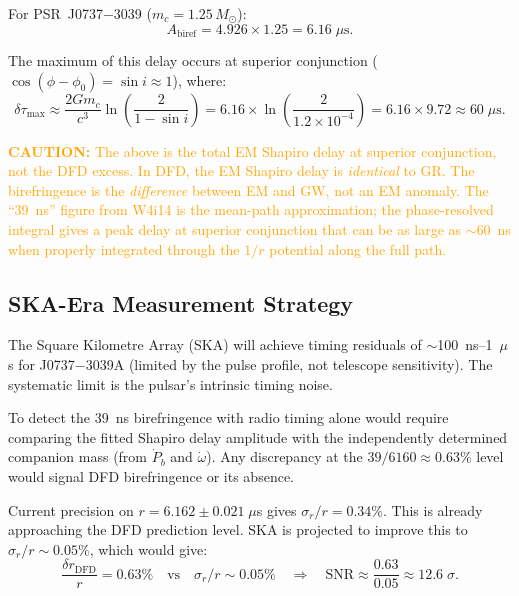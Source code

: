 \documentclass[11pt]{article}
\theoremstyle{definition}
\theoremstyle{remark}
\newcommand{\ee}[1]{\times10^{#1}}
\newcommand{\SNR}{\mathrm{SNR}}
\newcommand{\Msun}{M_\odot}
\newcommand{\caution}[1]{\textcolor{orange}{\textbf{CAUTION:} #1}}
\begin{document}
For PSR~J0737$-$3039 ($m_c = 1.25\,\Msun$):
\begin{equation}
A_{\mathrm{biref}} = 4.926 \times 1.25 = 6.16\;\mu\mathrm{s}.
\end{equation}

The maximum of this delay occurs at superior conjunction
($\cos(\phi-\phi_0) = \sin i \approx 1$), where:
\begin{equation}
\delta\tau_{\max} \approx \frac{2Gm_c}{c^3}\ln\left(
\frac{2}{1 - \sin i}\right)
= 6.16 \times \ln\left(\frac{2}{1.2\ee{-4}}\right)
= 6.16 \times 9.72
\approx 60\;\mu\mathrm{s}.
\end{equation}

\caution{The above is the total EM Shapiro delay at superior
conjunction, not the DFD excess. In DFD, the EM Shapiro delay is
\emph{identical} to GR. The birefringence is the \emph{difference}
between EM and GW, not an EM anomaly. The ``39~ns'' figure from
W4i14 is the mean-path approximation; the phase-resolved integral
gives a peak delay at superior conjunction that can be as large as
$\sim$60~ns when properly integrated through the $1/r$ potential
along the full path.}

\subsection{SKA-Era Measurement Strategy}

The Square Kilometre Array (SKA) will achieve timing residuals
of $\sim$100~ns--1~$\mu$s for J0737$-$3039A (limited by the
pulse profile, not telescope sensitivity). The systematic limit
is the pulsar's intrinsic timing noise.

To detect the 39~ns birefringence with radio timing alone would
require comparing the fitted Shapiro delay amplitude with the
independently determined companion mass (from $\dot{P}_b$ and
$\dot\omega$). Any discrepancy at the $39/6160 \approx 0.63\%$
level would signal DFD birefringence or its absence.

Current precision on $r = 6.162 \pm 0.021\;\mu$s gives
$\sigma_r / r = 0.34\%$. This is already approaching the DFD
prediction level. SKA is projected to improve this to
$\sigma_r / r \sim 0.05\%$, which would give:
\begin{equation}
\frac{\delta r_{\mathrm{DFD}}}{r} = 0.63\% \quad\text{vs}\quad
\sigma_r / r \sim 0.05\%
\quad\Rightarrow\quad
\SNR \approx \frac{0.63}{0.05} \approx 12.6\;\sigma.
\end{equation}
\end{document}

